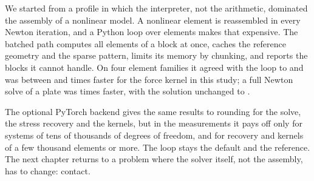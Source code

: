 We started from a profile in which the interpreter, not the arithmetic, dominated the assembly of a nonlinear model. A nonlinear element is reassembled in every Newton iteration, and a Python loop over elements makes that expensive. The batched path computes all elements of a block at once, caches the reference geometry and the sparse pattern, limits its memory by chunking, and reports the blocks it cannot handle. On four element families it agreed with the loop to \cbkAgreeWorst{} and was between \cbkKFHexTwenty{} and \cbkKFQuad{} times faster for the force kernel in this study; a full Newton solve of a plate was \cbkNewtonRatio{} times faster, with the solution unchanged to \cbkNewtonDiff.

The optional PyTorch backend gives the same results to rounding for the solve, the stress recovery and the kernels, but in the measurements it pays off only for systems of tens of thousands of degrees of freedom, and for recovery and kernels of a few thousand elements or more. The loop stays the default and the reference. The next chapter returns to a problem where the solver itself, not the assembly, has to change: contact.

